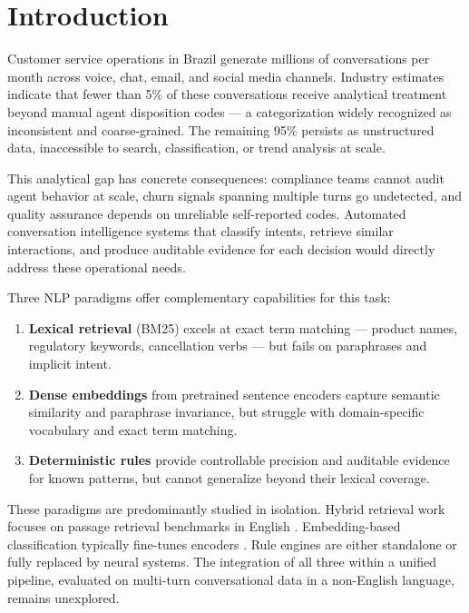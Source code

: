 \documentclass[11pt]{article}
\begin{document}
\section{Introduction}
\label{sec:intro}

Customer service operations in Brazil generate millions of conversations per month across voice, chat, email, and social media channels. Industry estimates indicate that fewer than 5\% of these conversations receive analytical treatment beyond manual agent disposition codes --- a categorization widely recognized as inconsistent and coarse-grained. The remaining 95\% persists as unstructured data, inaccessible to search, classification, or trend analysis at scale.

This analytical gap has concrete consequences: compliance teams cannot audit agent behavior at scale, churn signals spanning multiple turns go undetected, and quality assurance depends on unreliable self-reported codes. Automated conversation intelligence systems that classify intents, retrieve similar interactions, and produce auditable evidence for each decision would directly address these operational needs.

Three NLP paradigms offer complementary capabilities for this task:

\begin{enumerate}[leftmargin=*,itemsep=2pt]
    \item \textbf{Lexical retrieval} (BM25) excels at exact term matching --- product names, regulatory keywords, cancellation verbs --- but fails on paraphrases and implicit intent.
    \item \textbf{Dense embeddings} from pretrained sentence encoders capture semantic similarity and paraphrase invariance, but struggle with domain-specific vocabulary and exact term matching.
    \item \textbf{Deterministic rules} provide controllable precision and auditable evidence for known patterns, but cannot generalize beyond their lexical coverage.
\end{enumerate}

These paradigms are predominantly studied in isolation. Hybrid retrieval work focuses on passage retrieval benchmarks in English \citep{formal2021splade,khattab2020colbert,karpukhin2020dense}. Embedding-based classification typically fine-tunes encoders \citep{tunstall2022setfit,reimers2019sentencebert}. Rule engines are either standalone or fully replaced by neural systems. The integration of all three within a unified pipeline, evaluated on multi-turn conversational data in a non-English language, remains unexplored.
\end{document}
